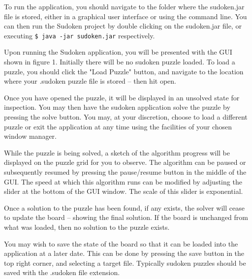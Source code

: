 To run the application, you should navigate to the folder where the sudoken.jar file is stored, either in a graphical user interface or using the command line. You can then run the Sudoken project by double clicking on the sudoken.jar file, or executing \texttt{\$ java -jar sudoken.jar} respectively.

Upon running the Sudoken application, you will be presented with the GUI shown in figure 1. Initially there will be no sudoken puzzle loaded. To load a puzzle, you should click the "Load Puzzle" button, and navigate to the location where your .sudoken puzzle file is stored -- then hit open.

Once you have opened the puzzle, it will be displayed in an unsolved state for inspection. You may then have the sudoken application solve the puzzle by pressing the solve button. You may, at your discretion, choose to load a different puzzle or exit the application at any time using the facilities of your chosen window manager.

While the puzzle is being solved, a sketch of the algorithm progress will be displayed on the puzzle grid for you to observe. The algorithm can be paused or subsequently resumed by pressing the pause/resume button in the middle of the GUI. The speed at which this algorithm runs can be modified by adjusting the slider at the bottom of the GUI window. The scale of this slider is exponential.

Once a solution to the puzzle has been found, if any exists, the solver will cease to update the board -- showing the final solution. If the board is unchanged from what was loaded, then no solution to the puzzle exists.

You may wish to save the state of the board so that it can be loaded into the application at a later date. This can be done by pressing the save button in the top right corner, and selecting a target file. Typically sudoken puzzles should be saved with the .sudoken file extension.
